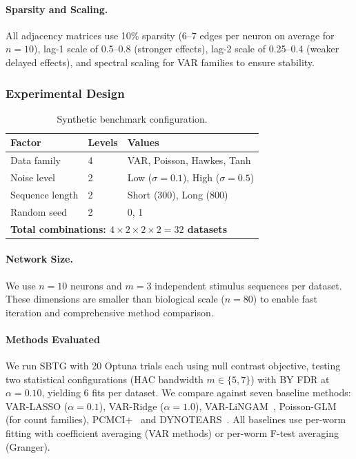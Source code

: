 \documentclass{article}
\theoremstyle{plain}
\theoremstyle{definition}
\theoremstyle{remark}
\newcommand{\1}{\mathbf{1}}
\begin{document}
\paragraph{Sparsity and Scaling.}
All adjacency matrices use 10\% sparsity (6--7 edges per neuron on average for $n=10$), lag-1 scale of 0.5--0.8 (stronger effects), lag-2 scale of 0.25--0.4 (weaker delayed effects), and spectral scaling for VAR families to ensure stability.

\subsubsection{Experimental Design}

\begin{table}[h!]
\centering
\caption{Synthetic benchmark configuration.}
\label{tab:synthetic_config}
\begin{tabular}{lll}
\toprule
\textbf{Factor} & \textbf{Levels} & \textbf{Values} \\
\midrule
Data family & 4 & VAR, Poisson, Hawkes, Tanh \\
Noise level & 2 & Low ($\sigma=0.1$), High ($\sigma=0.5$) \\
Sequence length & 2 & Short (300), Long (800) \\
Random seed & 2 & 0, 1 \\
\midrule
\multicolumn{3}{l}{\textbf{Total combinations: $4 \times 2 \times 2 \times 2 = 32$ datasets}} \\
\bottomrule
\end{tabular}
\end{table}

\paragraph{Network Size.}
We use $n = 10$ neurons and $m = 3$ independent stimulus sequences per dataset. These dimensions are smaller than biological scale ($n=80$) to enable fast iteration and comprehensive method comparison.

\paragraph{Methods Evaluated}

We run SBTG with 20 Optuna trials each using null contrast objective, testing two statistical configurations (HAC bandwidth $m \in \{5, 7\}$) with BY FDR at $\alpha = 0.10$, yielding 6 fits per dataset. We compare against seven baseline methods: VAR-LASSO ($\alpha = 0.1$), VAR-Ridge ($\alpha = 1.0$), VAR-LiNGAM~\citep{Hyvarinen2013lingam}, Poisson-GLM (for count families), PCMCI+~\citep{Runge2020PCMCIplus} and DYNOTEARS~\citep{pamfil2020dynotearsstructurelearningtimeseries}. All baselines use per-worm fitting with coefficient averaging (VAR methods) or per-worm F-test averaging (Granger).
\end{document}
